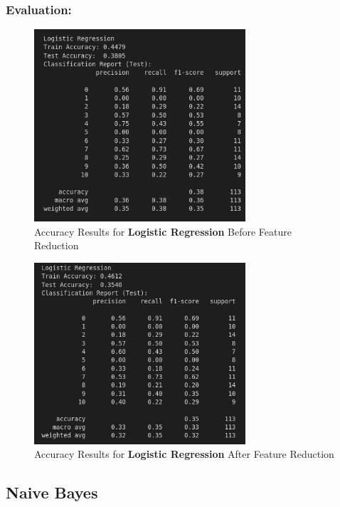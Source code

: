\documentclass[a4paper,12pt]{article}
\begin{document}
\subsubsection{Evaluation:}
\begin{figure}[H]
    \centering
    \includegraphics[width=0.7\textwidth]{./images/lracc1.png}
    \caption{Accuracy Results for \textbf{Logistic Regression} Before Feature Reduction}
    \label{fig:fig_9}
\end{figure}
\begin{figure}[H]
    \centering
    \includegraphics[width=0.7\textwidth]{./images/lracc2.png}
    \caption{Accuracy Results for \textbf{Logistic Regression} After Feature Reduction}
    \label{fig:fig_10}
\end{figure}

\subsection{Naive Bayes}
\end{document}
